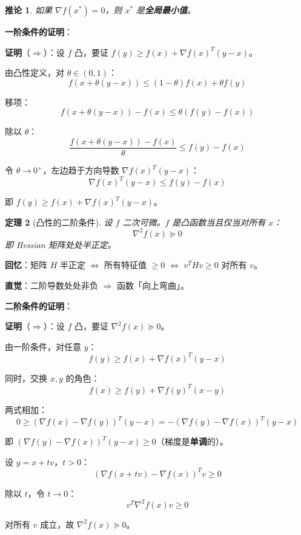 \documentclass[10pt]{article}
\numberwithin{equation}{section}
\theoremstyle{plain}
\newtheorem{theorem}{定理}[section]
\newtheorem{corollary}[theorem]{推论}
\theoremstyle{definition}
\theoremstyle{remark}
\begin{document}
\begin{corollary}
	如果 $\nabla f(x^*) = 0$，则 $x^*$ 是\textbf{全局最小值}。
\end{corollary}

\begin{AnalysisBox}
	\textbf{一阶条件的证明}：

	\textbf{证明}（$\Rightarrow$）：设 $f$ 凸，要证 $f(y) \geq f(x) + \nabla f(x)^T(y-x)$。

	由凸性定义，对 $\theta \in (0,1)$：
	\[f(x + \theta(y-x)) \leq (1-\theta) f(x) + \theta f(y)\]

	移项：
	\[f(x + \theta(y-x)) - f(x) \leq \theta (f(y) - f(x))\]

	除以 $\theta$：
	\[\frac{f(x + \theta(y-x)) - f(x)}{\theta} \leq f(y) - f(x)\]

	令 $\theta \to 0^+$，左边趋于方向导数 $\nabla f(x)^T(y-x)$：
	\[\nabla f(x)^T(y-x) \leq f(y) - f(x)\]

	即 $f(y) \geq f(x) + \nabla f(x)^T(y-x)$。
\end{AnalysisBox}

\begin{theorem}[凸性的二阶条件]
	设 $f$ 二次可微。$f$ 是凸函数当且仅当对所有 $x$：
	\[\nabla^2 f(x) \succeq 0\]
	即 Hessian 矩阵处处半正定。
\end{theorem}

\textbf{回忆}：矩阵 $H$ 半正定 $\Leftrightarrow$ 所有特征值 $\geq 0$ $\Leftrightarrow$ $v^T H v \geq 0$ 对所有 $v$。

\textbf{直觉}：二阶导数处处非负 $\Rightarrow$ 函数「向上弯曲」。

\begin{AnalysisBox}
	\textbf{二阶条件的证明}：

	\textbf{证明}（$\Rightarrow$）：设 $f$ 凸，要证 $\nabla^2 f(x) \succeq 0$。

	由一阶条件，对任意 $y$：
	\[f(y) \geq f(x) + \nabla f(x)^T(y-x)\]

	同时，交换 $x, y$ 的角色：
	\[f(x) \geq f(y) + \nabla f(y)^T(x-y)\]

	两式相加：
	\[0 \geq (\nabla f(x) - \nabla f(y))^T(y-x) = -(\nabla f(y) - \nabla f(x))^T(y-x)\]

	即 $(\nabla f(y) - \nabla f(x))^T(y-x) \geq 0$（梯度是\textbf{单调}的）。

	设 $y = x + tv$，$t > 0$：
	\[(\nabla f(x+tv) - \nabla f(x))^T v \geq 0\]

	除以 $t$，令 $t \to 0$：
	\[v^T \nabla^2 f(x) v \geq 0\]

	对所有 $v$ 成立，故 $\nabla^2 f(x) \succeq 0$。
\end{AnalysisBox}
\end{document}
